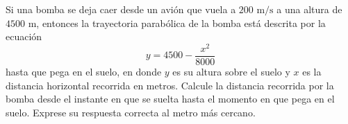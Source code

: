 \item Si una bomba se deja caer desde un avión que vuela a $200 \text{ m/s}$ a una altura de $4500 \text{ m}$, entonces la trayectoria parabólica de la bomba está descrita por la ecuación
    \[ y = 4500 - \frac{x^2}{8000} \]
    hasta que pega en el suelo, en donde $y$ es su altura sobre el suelo y $x$ es la distancia horizontal recorrida en metros. Calcule la distancia recorrida por la bomba desde el instante en que se suelta hasta el momento en que pega en el suelo. Exprese su respuesta correcta al metro más cercano.
